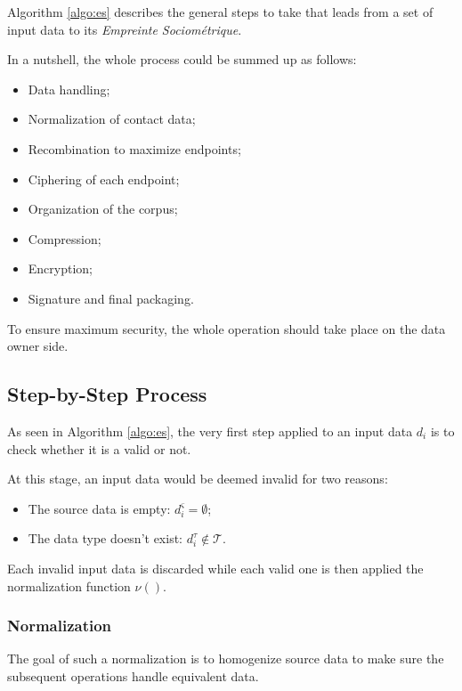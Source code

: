 \documentclass[twoside,twocolumn]{article}
\theoremstyle{definition}
\theoremstyle{remark}
\begin{document}
Algorithm \ref{algo:es} describes the general steps to take that leads from a set of input data to its \emph{Empreinte Sociométrique}.

In a nutshell, the whole process could be summed up as follows:
\begin{itemize}
    \item Data handling;
    \item Normalization of contact data;
    \item Recombination to maximize endpoints;
    \item Ciphering of each endpoint;
    \item Organization of the corpus;
    \item Compression;
    \item Encryption;
    \item Signature and final packaging.
\end{itemize}

To ensure maximum security, the whole operation should take place on the data owner side.

\subsection{Step-by-Step Process}

As seen in Algorithm \ref{algo:es}, the very first step applied to an input data $d_i$ is to check whether it is a valid or not.

At this stage, an input data would be deemed invalid for two reasons:
\begin{itemize}
    \item The source data is empty: $d_i^\varsigma = \emptyset$;
    \item The data type doesn't exist: $d_i^\tau \not\in \mathcal{T}$.
\end{itemize}

Each invalid input data is discarded while each valid one is then applied the normalization function $\nu()$.

\subsubsection{Normalization}

The goal of such a normalization is to homogenize source data to make sure the subsequent operations handle equivalent data.
\end{document}
